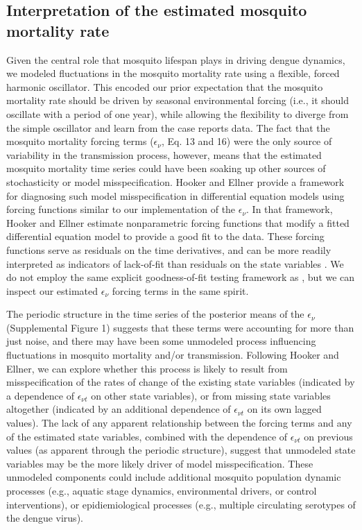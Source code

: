 \documentclass[10pt,letterpaper]{article}
\begin{document}
\subsection*{Interpretation of the estimated mosquito mortality rate}

Given the central role that mosquito lifespan plays in driving dengue dynamics, we modeled fluctuations in the mosquito mortality rate using a flexible, forced harmonic oscillator.
This encoded our prior expectation that the mosquito mortality rate should be driven by seasonal environmental forcing (i.e., it should oscillate with a period of one year), while allowing the flexibility to diverge from the simple oscillator and learn from the case reports data.
The fact that the mosquito mortality forcing terms ($\epsilon_{\nu}$, Eq. 13 and 16) were the only source of variability in the transmission process, however, means that the estimated mosquito mortality time series could have been soaking up other sources of stochasticity or model misspecification.
Hooker and Ellner \cite{Hooker2015} provide a framework for diagnosing such model misspecification in differential equation models using forcing functions similar to our implementation of the $\epsilon_{\nu}$.
In that framework, Hooker and Ellner \cite{Hooker2015} estimate nonparametric forcing functions that modify a fitted differential equation model to provide a good fit to the data.
These forcing functions serve as residuals on the time derivatives, and can be more readily interpreted as indicators of lack-of-fit than residuals on the state variables \cite{Hotelling1927, Hooker2015}.
We do not employ the same explicit goodness-of-fit testing framework as \cite{Hooker2015}, but we can inspect our estimated $\epsilon_{\nu}$ forcing terms in the same spirit.

The periodic structure in the time series of the posterior means of the $\epsilon_{\nu}$ (Supplemental Figure 1) suggests that these terms were accounting for more than just noise, and there may have been some unmodeled process influencing fluctuations in mosquito mortality and/or transmission.
Following Hooker and Ellner, we can explore whether this process is likely to result from misspecification of the rates of change of the existing state variables (indicated by a dependence of $\epsilon_{\nu t}$ on other state variables), or from missing state variables altogether (indicated by an additional dependence of $\epsilon_{\nu t}$ on its own lagged values). 
The lack of any apparent relationship between the forcing terms and any of the estimated state variables, combined with the dependence of $\epsilon_{\nu t}$ on previous values (as apparent through the periodic structure), suggest that unmodeled state variables may be the more likely driver of model misspecification.
These unmodeled components could include additional mosquito population dynamic processes (e.g., aquatic stage dynamics, environmental drivers, or control interventions), or epidiemiological processes (e.g., multiple circulating serotypes of the dengue virus).
\end{document}
